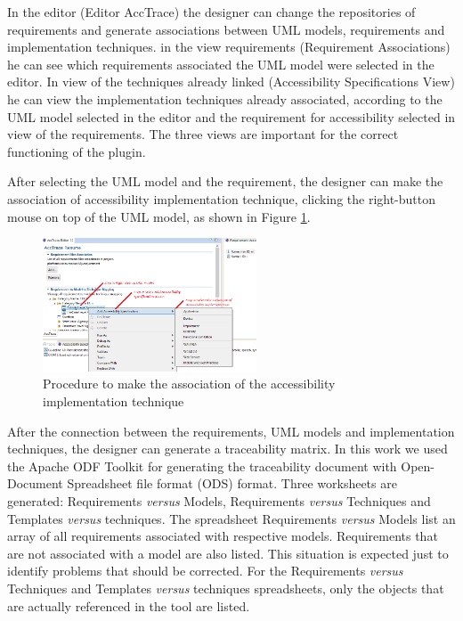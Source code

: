 \documentclass[10pt, conference, compsocconf]{IEEEtran}
\begin{document}
In the editor (Editor AccTrace) the designer can change the repositories of requirements and generate associations between UML models, requirements and implementation techniques. in the view requirements (Requirement Associations) he can see which requirements associated
the UML model were selected in the editor. In view of the techniques already linked
(Accessibility Specifications View) he can view the implementation techniques already
associated, according to the UML model selected in the editor and the requirement for accessibility
selected in view of the requirements. The three views are important for the correct functioning
of the plugin.


After selecting the UML model and the requirement, the designer can make the association of
accessibility implementation technique, clicking the right-button mouse on
top of the UML model, as shown in Figure \ref{fig:rightclick}.


\begin{figure}[!t]
\centering
\includegraphics[width=2.5in]{./img/rightclick.png}
\caption{Procedure to make the association of the accessibility implementation technique}
\label{fig:rightclick}
\end{figure}

After the connection between the requirements, UML models and implementation techniques, the designer can generate a traceability matrix.
In this work we used the Apache ODF Toolkit for generating the traceability document with Open-Document Spreadsheet file format (ODS) format. Three worksheets are generated: Requirements \textit {versus} Models, Requirements \textit{versus} Techniques and Templates \textit{versus} techniques. The spreadsheet Requirements \textit{versus} Models list an array of all requirements associated with respective models. Requirements that are not associated with a model are also listed. This situation is expected
just to identify problems that should be corrected. For the Requirements \textit{versus} Techniques and Templates \textit{versus} techniques spreadsheets, only the objects that
are actually referenced in the tool are listed.
\end{document}
